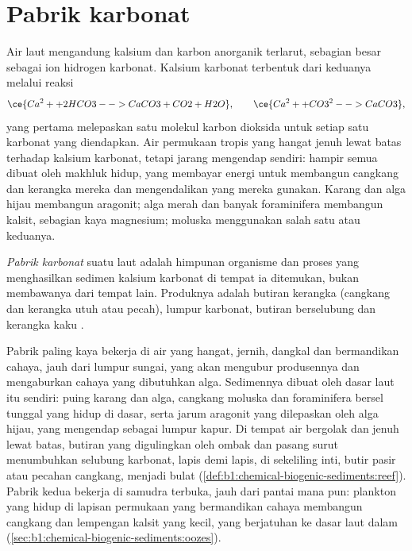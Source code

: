\section{Pabrik karbonat}\label{sec:b1:chemical-biogenic-sediments:factory}

Air laut mengandung kalsium dan karbon anorganik terlarut, sebagian besar sebagai ion hidrogen karbonat. Kalsium karbonat terbentuk dari keduanya melalui reaksi
\[
\ce{Ca^2+ + 2 HCO3- -> CaCO3 + CO2 + H2O}, \qquad
\ce{Ca^2+ + CO3^2- -> CaCO3},
\]
yang pertama melepaskan satu molekul karbon dioksida untuk setiap satu karbonat yang diendapkan. Air permukaan tropis yang hangat jenuh lewat batas terhadap kalsium karbonat, tetapi jarang mengendap sendiri: hampir semua dibuat oleh makhluk hidup, yang membayar energi untuk membangun cangkang dan kerangka mereka dan mengendalikan  yang mereka gunakan. Karang dan alga hijau membangun aragonit; alga merah dan banyak foraminifera membangun kalsit, sebagian kaya magnesium; moluska menggunakan salah satu atau keduanya.

\begin{definition}\label{def:b1:chemical-biogenic-sediments:factory}
\emph{Pabrik karbonat} suatu laut adalah himpunan organisme dan proses yang menghasilkan sedimen kalsium karbonat di tempat ia ditemukan, bukan membawanya dari tempat lain. Produknya adalah butiran kerangka (cangkang dan kerangka utuh atau pecah), lumpur karbonat, butiran berselubung dan kerangka kaku .
\end{definition}

Pabrik paling kaya bekerja di air yang hangat, jernih, dangkal dan bermandikan cahaya, jauh dari lumpur sungai, yang akan mengubur produsennya dan mengaburkan cahaya yang dibutuhkan alga. Sedimennya dibuat oleh dasar laut itu sendiri: puing karang dan alga, cangkang moluska dan foraminifera bersel tunggal yang hidup di dasar, serta jarum aragonit yang dilepaskan oleh alga hijau, yang mengendap sebagai lumpur kapur. Di tempat air bergolak dan jenuh lewat batas, butiran yang digulingkan oleh ombak dan pasang surut menumbuhkan selubung karbonat, lapis demi lapis, di sekeliling inti, butir pasir atau pecahan cangkang, menjadi  bulat (\cref{def:b1:chemical-biogenic-sediments:reef}). Pabrik kedua bekerja di samudra terbuka, jauh dari pantai mana pun: plankton yang hidup di lapisan permukaan yang bermandikan cahaya membangun cangkang dan lempengan kalsit yang kecil, yang berjatuhan ke dasar laut dalam (\cref{sec:b1:chemical-biogenic-sediments:oozes}).

